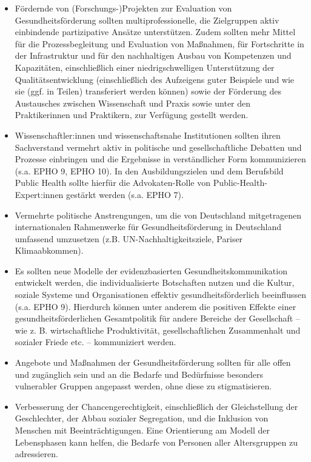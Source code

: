 \documentclass{article}
\begin{document}
\begin{itemize}
\item Fördernde von (Forschungs-)Projekten zur Evaluation von Gesundheitsförderung sollten multiprofessionelle, die Zielgruppen aktiv einbindende partizipative Ansätze unterstützen. Zudem sollten mehr Mittel für die Prozessbegleitung und Evaluation von Maßnahmen, für Fortschritte in der Infrastruktur und für den nachhaltigen Ausbau von Kompetenzen und Kapazitäten, einschließlich einer niedrigschwelligen Unterstützung der Qualitätsentwicklung (einschließlich des Aufzeigens guter Beispiele und wie sie (ggf. in Teilen) transferiert werden können) sowie der Förderung des Austausches zwischen Wissenschaft und Praxis sowie unter den Praktikerinnen und Praktikern, zur Verfügung gestellt werden.


\item Wissenschaftler:innen und wissenschaftsnahe Institutionen sollten ihren Sachverstand vermehrt aktiv in politische und gesellschaftliche Debatten und Prozesse einbringen und die Ergebnisse in verständlicher Form kommunizieren (s.a. EPHO 9, EPHO 10). In den Ausbildungszielen und dem Berufsbild Public Health sollte hierfür die Advokaten-Rolle von Public-Health-Expert:innen gestärkt werden (s.a. EPHO 7). 


\item Vermehrte politische Anstrengungen, um die von Deutschland mitgetragenen internationalen Rahmenwerke für Gesundheitsförderung in Deutschland umfassend umzusetzen (z.B. UN-Nachhaltigkeitsziele, Pariser Klimaabkommen).


\item Es sollten neue Modelle der evidenzbasierten Gesundheitskommunikation entwickelt werden, die individualisierte Botschaften nutzen und die Kultur, soziale Systeme und Organisationen effektiv gesundheitsförderlich beeinflussen (s.a. EPHO 9). Hierdurch können unter anderem die positiven Effekte einer gesundheitsförderlichen Gesamtpolitik für andere Bereiche der Gesellschaft – wie z. B. wirtschaftliche Produktivität, gesellschaftlichen Zusammenhalt und sozialer Friede etc. – kommuniziert werden. 


\item Angebote und Maßnahmen der Gesundheitsförderung sollten für alle offen und zugänglich sein und an die Bedarfe und Bedürfnisse besonders vulnerabler Gruppen angepasst werden, ohne diese zu stigmatisieren. 


\item Verbesserung der Chancengerechtigkeit, einschließlich der Gleichstellung der Geschlechter, der Abbau sozialer Segregation, und die Inklusion von Menschen mit Beeinträchtigungen. Eine Orientierung am Modell der Lebensphasen kann helfen, die Bedarfe von Personen aller Altersgruppen zu adressieren.



\end{itemize}
\end{document}
